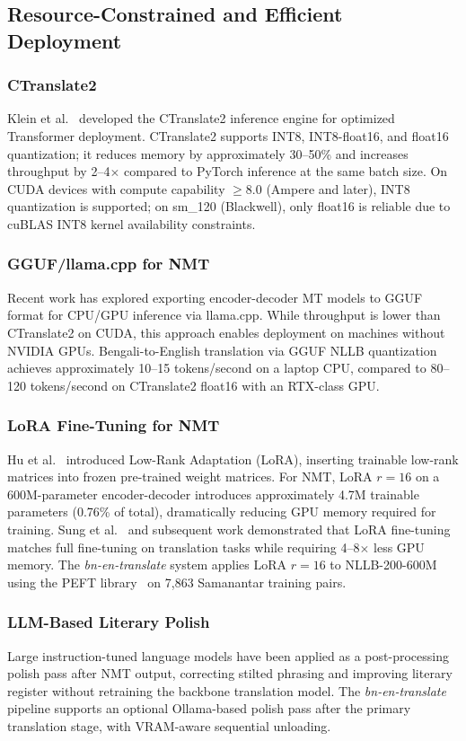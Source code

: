 \documentclass[conference]{IEEEtran}
\begin{document}
\subsection{Resource-Constrained and Efficient Deployment}

\subsubsection{CTranslate2}
Klein et al.~\cite{klein2020opennmt} developed the CTranslate2
inference engine for optimized Transformer deployment.
CTranslate2 supports INT8, INT8-float16, and float16 quantization;
it reduces memory by approximately 30--50\% and increases throughput
by 2--4$\times$ compared to PyTorch inference at the same batch size.
On CUDA devices with compute capability $\ge$8.0 (Ampere and later),
INT8 quantization is supported; on sm\_120 (Blackwell), only float16
is reliable due to cuBLAS INT8 kernel availability constraints.

\subsubsection{GGUF/llama.cpp for NMT}
Recent work has explored exporting encoder-decoder MT models to GGUF
format for CPU/GPU inference via llama.cpp.
While throughput is lower than CTranslate2 on CUDA, this approach
enables deployment on machines without NVIDIA GPUs.
Bengali-to-English translation via GGUF NLLB quantization achieves
approximately 10--15 tokens/second on a laptop CPU, compared to
80--120 tokens/second on CTranslate2 float16 with an RTX-class GPU.

\subsubsection{LoRA Fine-Tuning for NMT}
Hu et al.~\cite{hu2022lora} introduced Low-Rank Adaptation (LoRA),
inserting trainable low-rank matrices into frozen pre-trained weight
matrices.
For NMT, LoRA $r=16$ on a 600M-parameter encoder-decoder introduces
approximately 4.7M trainable parameters (0.76\% of total), dramatically
reducing GPU memory required for training.
Sung et al.~\cite{sung2022lst} and subsequent work demonstrated that
LoRA fine-tuning matches full fine-tuning on translation tasks while
requiring 4--8$\times$ less GPU memory.
The \textit{bn-en-translate} system applies LoRA $r=16$ to NLLB-200-600M
using the PEFT library~\cite{mangrulkar2022peft} on 7,863 Samanantar
training pairs.

\subsubsection{LLM-Based Literary Polish}
Large instruction-tuned language models have been applied as a post-processing
polish pass after NMT output, correcting stilted phrasing and improving literary
register without retraining the backbone translation model.
The \textit{bn-en-translate} pipeline supports an optional Ollama-based polish
pass after the primary translation stage, with VRAM-aware sequential unloading.
\end{document}
